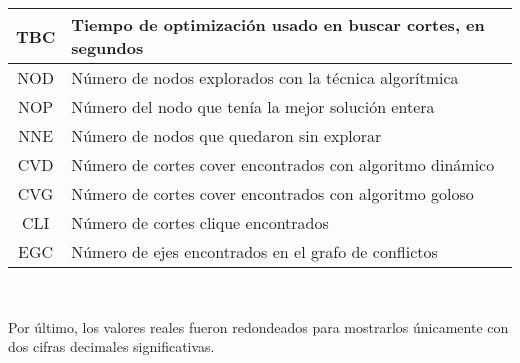 {\begin{tabular}{c p{10cm}}
\hline
TBC & Tiempo de optimización usado en buscar cortes, en segundos\\
\hline
NOD & Número de nodos explorados con la técnica algorítmica\\
\hline
NOP & Número del nodo que tenía la mejor solución entera\\
\hline
NNE & Número de nodos que quedaron sin explorar\\
\hline
CVD & Número de cortes cover encontrados con algoritmo dinámico\\
\hline
CVG & Número de cortes cover encontrados con algoritmo goloso\\
\hline
CLI & Número de cortes clique encontrados\\
\hline
EGC & Número de ejes encontrados en el grafo de conflictos\\
\hline
\end{tabular}\\}
\vspace{1cm}

\noindent Por último, los valores reales fueron redondeados para mostrarlos únicamente con dos cifras decimales significativas.
